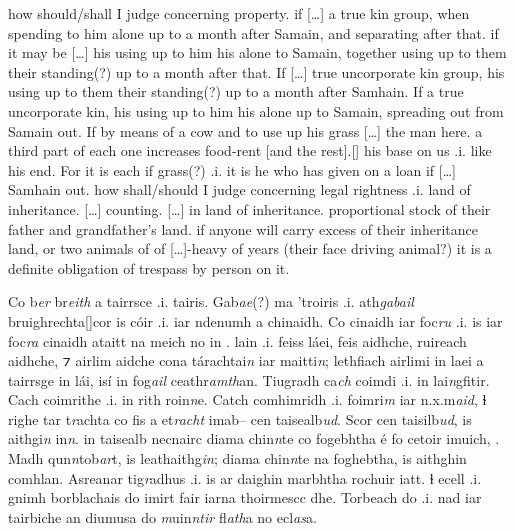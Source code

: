 \documentclass[11pt]{article}
\begin{document}
\begin{pages}
\begin{Rightside}
    \pstart
    how should/shall I judge concerning property. if [\ldots] a true kin group, when spending to him alone up to a month after Samain, and separating after that. if it may be [\ldots] his using up to him his alone to Samain, together using up to them their standing(?) up to a month after that.  If [\ldots] true uncorporate kin group, his using up to them their standing(?) up to a month after Samhain.  If a true uncorporate kin, his using up to him his alone up to Samain, spreading out from Samain out.  If by means of a cow and to use up his grass [\ldots] the man here.  a third part of each one increases food-rent [and the rest].[\hspace{2mm}] his base on us .i. like his end. For it is each if grass(?) .i. it is he who has given on a loan if [\ldots] Samhain out.  how shall/should I judge concerning legal rightness .i. land of inheritance.  [\ldots] counting.  [\ldots] in land of inheritance.  proportional stock of their father and grandfather's land. if anyone will carry excess of their inheritance land, or two animals of of [\ldots]-heavy of years (their face driving animal?) it is a definite obligation of trespass by person on it. 

    \pend
  \endnumbering
  \end{Rightside}

  \Pages
 
  \begin{Leftside}
    \beginnumbering
    \pstart
    Co b\emph{er} br\emph{eith} a tairrsce .i.  tairis.  Gab\emph{ae}(?) ma 'troiris .i. ath\emph{gabail} bruighrechta[\hspace{2mm}]cor is c\'{o}ir .i. iar ndenumh a chinaidh.  Co cinaidh iar foc\emph{ru} .i. is iar foc\emph{ra} cinaidh ataitt na meich no in .   lain .i. feiss l\'{a}ei, feis aidhche, ruireach aidhche, ⁊ airlim aidche cona t\'{a}rachtai\emph{n} iar maitti\emph{n}; lethfiach airlimi in laei a tairrsge in l\'{a}i, is\'{i} in fog\emph{ail} ceathr\emph{amth}an.  Tiugradh  ca\emph{ch} coimdi .i. in lai\emph{n}gfitir.  Cach coimrithe .i. in rith roin\emph{n}e.  Catch comhimridh .i. foimri\emph{m} iar n.x.m\emph{aid}, ɫ righe tar t\emph{r}achta co fis a et\emph{racht} imab-- cen taisealb\emph{ud}.  Scor cen taisilb\emph{ud}, is aithgi\emph{n} in\emph{n}.  in taisealb necnairc diama chin\emph{n}te co fogebhtha \'{e} fo cetoir imuich, .  Madh qun\emph{n}tob\emph{ar}t, is leathaithg\emph{in}; diama chin\emph{n}te na foghebtha, is aithghin comhlan.  Asreanar tig\emph{r}adhus .i. is ar daighin marbhtha rochuir iatt. ɫ ecell .i. gnimh borblachais do imirt fair iarna thoirmescc dhe. Torbeach do  .i. nad iar tairbiche an diumusa do \emph{m}uin\emph{ntir} fl\emph{ath}a no ecl\emph{as}a. 
        \pend
  \endnumbering
  \end{Leftside}


\end{pages}
\end{document}
